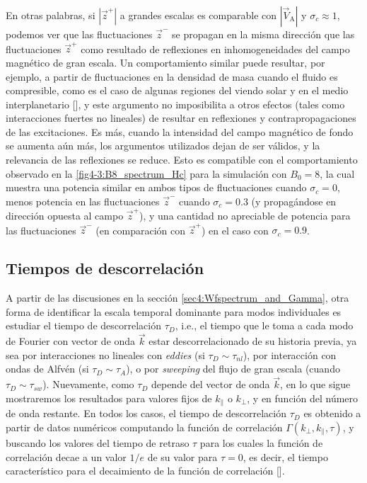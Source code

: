 En otras palabras, si $|\vec{z}^+|$ a grandes escalas es comparable
con $|\vec{V}_\textrm{A}|$ y $\sigma_c \approx 1$, podemos ver que las
fluctuaciones $\vec{z}^-$ se propagan en la misma dirección que las
fluctuaciones $\vec{z}^+$ como resultado de reflexiones en
inhomogeneidades del campo magnético de gran escala.  Un
comportamiento similar puede resultar, por ejemplo, a partir de
fluctuaciones en la densidad de masa cuando el fluido es compresible,
como es el caso de algunas regiones del viendo solar y en el medio
interplanetario [\cite{zhou_1989_nonWKBevolution}], y este argumento no
imposibilita a otros efectos (tales como interacciones fuertes no
lineales) de resultar en reflexiones y contrapropagaciones de las
excitaciones. Es más, cuando la intensidad del campo magnético de
fondo se aumenta aún más, los argumentos utilizados dejan de ser
válidos, y la relevancia de las reflexiones se reduce. Esto es
compatible con el comportamiento observado en la
\cref{fig4-3:B8_spectrum_Hc} para la simulación con $B_0=8$, la cual
muestra una potencia similar en ambos tipos de fluctuaciones cuando
$\sigma_c=0$, menos potencia en las fluctuaciones $\vec{z}^-$ cuando
$\sigma_c=0.3$ (y propagándose en dirección opuesta al campo
$\vec{z}^+$), y una cantidad no apreciable de potencia para las
fluctuaciones $\vec{z}^-$ (en comparación con $\vec{z}^+$) en el caso
con $\sigma_c=0.9$.

\subsection{Tiempos de descorrelación}

A partir de las discusiones en la sección
\ref{sec4:Wfspectrum_and_Gamma}, otra forma de identificar la escala
temporal dominante para modos individuales es estudiar el tiempo de
descorrelación $\tau_D$, i.e., el tiempo que le toma a cada modo de
Fourier con vector de onda $\vec{k}$ estar descorrelacionado de su
historia previa, ya sea por interacciones no lineales con
\textit{eddies} (si $\tau_D \sim \tau_{nl}$), por interacción con
ondas de Alfv\'en (si $\tau_D \sim \tau_A$), o por \textit{sweeping} del
flujo de gran escala (cuando $\tau_D \sim \tau_{sw}$). Nuevamente,
como $\tau_D$ depende del vector de onda $\vec{k}$, en lo que sigue
mostraremos los resultados para valores fijos de $k_\parallel$ o
$k_\perp$, y en función del número de onda restante. En todos los
casos, el tiempo de descorrelación $\tau_D$ es obtenido a partir de
datos numéricos computando la función de correlación
$\Gamma(k_{\perp},k_{\parallel},\tau)$, y buscando los valores del
tiempo de retraso $\tau$ para los cuales la función de
correlación decae a un valor $1/e$ de su valor para $\tau=0$, es
decir, el tiempo característico para el decaimiento de la función de
correlación [\cite{lugones_2016_spatiotemporal}].

